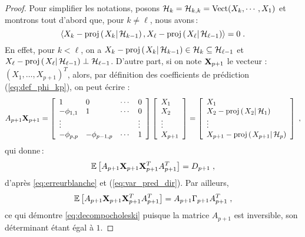 \begin{proof}
Pour simplifier les notations, posons $\mathcal{H}_k =\mathcal{H}_{k,k}= \mathrm{Vect}(X_k, \cdots, X_1)$ et montrons tout
d'abord que, pour $k \neq \ell$, nous avons\,:
\begin{equation}
 \label{eq:erreurblanche}
 \pscal{X_k - \proj{X_k}{\cH_{k-1}}}{X_{\ell} - \proj{X_{\ell}}{\cH_{{\ell}-1}}} = 0 \eqsp.
\end{equation}
En effet, pour $k < \ell$, on a $X_{k} - \proj{X_{k}}{\cH_{k-1}} \in
\cH_k\subseteq\cH_{\ell-1}$ et $X_{\ell} -
\proj{X_{\ell}}{\cH_{\ell-1}} \perp \cH_{\ell-1}$.
D'autre part, si on note ${\bf X}_{p+1}$ le vecteur :
$(X_1,\dots,X_{p+1})^T$, alors,
par d\'efinition des coefficients de pr\'ediction (\ref{eq:def_phi_kp}), on peut \'ecrire :
\[
A_{p+1} {\bf X}_{p+1} = \left[
\begin{array}{llll}
1            & 0             & \cdots & 0 \\
- \phi_{1,1} & 1             & \cdots & 0 \\
\vdots       &               &        & \vdots \\
- \phi_{p,p} & - \phi_{p-1,p}& \cdots & 1
\end{array}
\right] \left[
\begin{array}{l}
X_{1} \\
X_{2} \\
\vdots \\
X_{p+1}
\end{array}
\right] = \left [
\begin{array}{l}
X_1 \\
X_2 - \proj{X_2}{\cH_1} \\
\vdots \\
X_{p+1} - \proj{X_{p+1}}{\cH_{p}}
\end{array}
\right ]\;,
\]
qui donne\,:
$$
 {\mathbb E}\left[ A_{p+1} {\bf X}_{p+1} {\bf X}_{p+1}^T A_{p+1}^T \right]
 =D_{p+1}\;,
$$
d'apr\`es \eqref{eq:erreurblanche} et (\ref{eq:var_pred_dir}).
Par ailleurs,
$$
{\mathbb E}\left[ A_{p+1} {\bf X}_{p+1} {\bf X}_{p+1}^T A_{p+1}^T \right]
= A_{p+1} \Gamma_{p+1}A_{p+1}^T\;,
$$
ce qui d\'emontre \eqref{eq:decompocholeski} puisque la
matrice $A_{p+1}$ est inversible, son d\'eterminant \'etant \'egal \`a
$1$.

\end{proof}
